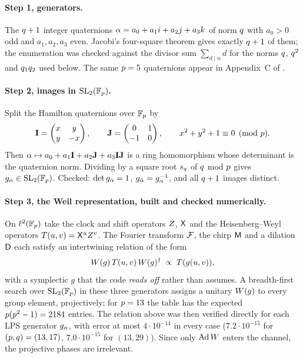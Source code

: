 \paragraph{Step 1, generators.} The $q+1$ integer quaternions
$\alpha = a_0 + a_1 i + a_2 j + a_3 k$ of norm $q$ with $a_0>0$ odd and
$a_1,a_2,a_3$ even. Jacobi's four-square theorem gives exactly $q+1$ of
them; the enumeration was checked against the divisor sum
$\sum_{d\mid n}d$ for the norms $q$, $q^2$ and $q_1q_2$ used below. The same $p=5$ quaternions appear in
Appendix~C of \cite{iyer2026ramanujan}.

\paragraph{Step 2, images in $\mathrm{SL}_2(\mathbb F_p)$.} Split the Hamilton quaternions over
$\mathbb F_p$ by
\[
  \mathbf I = \begin{pmatrix} x & y \\ y & -x\end{pmatrix},
  \qquad
  \mathbf J = \begin{pmatrix} 0 & 1 \\ -1 & 0\end{pmatrix},
  \qquad x^2+y^2+1\equiv0 \pmod {p} .
\]
Then $\alpha\mapsto a_0 + a_1\mathbf I + a_2\mathbf J + a_3\mathbf I\mathbf J$ is a ring
homomorphism whose determinant is the quaternion norm. Dividing by a square
root $s_q$ of $q$ mod $p$ gives $g_{\alpha}\in\mathrm{SL}_2(\mathbb F_p)$. Checked:
$\det g_{\alpha} = 1$, $g_{\bar{\alpha}} = g_{\alpha}^{-1}$, and all $q+1$ images
distinct.

\paragraph{Step 3, the Weil representation, built and checked numerically.}
On $\ell^2(\mathbb F_p)$ take the clock and shift operators $Z$, $\mathsf X$ and the
Heisenberg--Weyl operators $T(u,v) = \mathsf X^uZ^v$. The Fourier transform
$\mathcal F$, the chirp $\mathsf M$ and a dilation $\mathsf D$ each satisfy an
intertwining relation of the form
\[
  W(g)\,T(u,v)\,W(g)^\dagger \;\propto\; T(g(u,v)),
\]
with a symplectic $g$ that the code \emph{reads off} rather than assumes. A
breadth-first search over $\mathrm{SL}_2(\mathbb F_p)$ in these three generators assigns a
unitary $W(g)$ to every group element, projectively; for $p=13$ the
table has the expected $p(p^2-1)=2184$ entries. The relation above was
then verified directly for each LPS generator $g_{\alpha}$, with error at most
$4\cdot10^{-14}$ in every case ($7.2\cdot10^{-15}$ for $(p,q)=(13,17)$,
$7.0\cdot10^{-15}$ for $(13,29)$). Since only $\operatorname{Ad}W$ enters the channel,
the projective phases are irrelevant.


